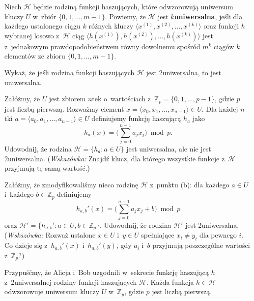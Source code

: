 
\noindent Niech $\mathcal{H}$ będzie rodziną funkcji haszujących, które odwzorowują uniwersum kluczy $U$ w~zbiór $\{0,1,\dots,m-1\}$.
Powiemy, że $\mathcal{H}$ jest \textbf{$k$\nbhyphen uniwersalna}, jeśli dla każdego ustalonego ciągu $k$ różnych kluczy $\langle x^{(1)},x^{(2)},\dots,x^{(k)}\rangle$ oraz funkcji $h$ wybranej losowo z~$\mathcal{H}$ ciąg $\langle h(x^{(1)}),h(x^{(2)}),\dots,h(x^{(k)})\rangle$ jest z~jednakowym prawdopodobieństwem równy dowolnemu spośród $m^k$ ciągów $k$ elementów ze zbioru $\{0,1,\dots,m-1\}$.
\begin{description}
	\setlength{}
	\item[{\sffamily\bfseries(a)}] Wykaż, że jeśli rodzina funkcji haszujących $\mathcal{H}$ jest 2\nbhyphen uniwersalna, to jest uniwersalna.
	\item[{\sffamily\bfseries(b)}] Załóżmy, że $U$ jest zbiorem $n$\nbhyphen tek o~wartościach z~$\mathbb{Z}_p=\{0,1,\dots,p-1\}$, gdzie $p$ jest liczbą pierwszą.
Rozważmy element $x=\langle x_0,x_1,\dots,x_{n-1}\rangle\in U$.
Dla każdej $n$\nbhyphen tki $a=\langle a_0,a_1,\dots,a_{n-1}\rangle\in U$ definiujemy funkcję haszującą $h_a$ jako
	\[
		h_a(x) = \biggl(\sum_{j=0}^{n-1}a_jx_j\biggr)\bmod p.
	\]
	Udowodnij, że rodzina $\mathcal{H}=\{h_a:a\in U\}$ jest uniwersalna, ale nie jest 2\nbhyphen uniwersalna.
(\!\emph{Wskazówka:} Znajdź klucz, dla którego wszystkie funkcje z~$\mathcal{H}$ przyjmują tę samą wartość.)
	\item[{\sffamily\bfseries(c)}] Załóżmy, że zmodyfikowaliśmy nieco rodzinę $\mathcal{H}$ z~punktu (b): dla każdego $a\in U$ i~każdego $b\in\mathbb{Z}_p$ definiujemy
	\[
		h_{a,b}'(x) = \biggl(\sum_{j=0}^{n-1}a_jx_j+b\biggr)\bmod p
	\]
	oraz $\mathcal{H}'=\{h_{a,b}':a\in U,b\in\mathbb{Z}_p\}$.
Udowodnij, że rodzina $\mathcal{H}'$ jest 2\nbhyphen uniwersalna.
(\!\emph{Wskazówka:} Rozważ ustalone $x\in U$ i~$y\in U$ spełniające $x_i\ne y_i$ dla pewnego $i$.
Co dzieje się z~$h_{a,b}'(x)$ i~$h_{a,b}'(y)$, gdy $a_i$ i~$b$ przyjmują poszczególne wartości z~$\mathbb{Z}_p$?)
	\item[{\sffamily\bfseries(d)}] Przypuśćmy, że Alicja i~Bob uzgodnili w~sekrecie funkcję haszującą $h$ z~2\nbhyphen uniwersalnej rodziny funkcji haszujących $\mathcal{H}$.
Każda funkcja $h\in\mathcal{H}$ odwzorowuje uniwersum kluczy $U$ w~$\mathbb{Z}_p$, gdzie $p$ jest liczbą pierwszą.

\end{description}
